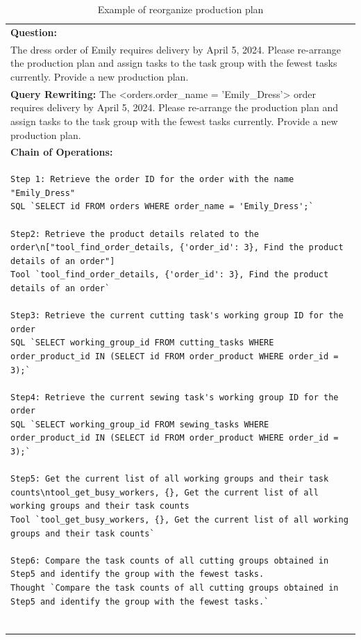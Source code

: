 \documentclass[preprint,12pt]{elsarticle}
\begin{document}
\begin{center}
\begin{longtable}{p{390pt}}
\caption{Example of reorganize production plan}
    \label{tab:case_reorganize_production_plan}\\
    \toprule
      \textbf{Question:} \\
       The dress order of Emily requires delivery by April 5, 2024. Please re-arrange the production plan and assign tasks to the task group with the fewest tasks currently. Provide a new production plan.\\
          \hline
          \textbf{Query Rewriting: }
          The <orders.order\_name = 'Emily\_Dress'> order requires delivery by April 5, 2024. Please re-arrange the production plan and assign tasks to the task group with the fewest tasks currently. Provide a new production plan.\\
 \hline
\textbf{Chain of Operations:}\\

\begin{lstlisting}[style=my_operation, label={lst:chain_of_operation}]
Step 1: Retrieve the order ID for the order with the name "Emily_Dress"
SQL `SELECT id FROM orders WHERE order_name = 'Emily_Dress';`

Step2: Retrieve the product details related to the order\n["tool_find_order_details, {'order_id': 3}, Find the product details of an order"]
Tool `tool_find_order_details, {'order_id': 3}, Find the product details of an order`

Step3: Retrieve the current cutting task's working group ID for the order
SQL `SELECT working_group_id FROM cutting_tasks WHERE order_product_id IN (SELECT id FROM order_product WHERE order_id = 3);`

Step4: Retrieve the current sewing task's working group ID for the order
SQL `SELECT working_group_id FROM sewing_tasks WHERE order_product_id IN (SELECT id FROM order_product WHERE order_id = 3);`

Step5: Get the current list of all working groups and their task counts\ntool_get_busy_workers, {}, Get the current list of all working groups and their task counts
Tool `tool_get_busy_workers, {}, Get the current list of all working groups and their task counts`

Step6: Compare the task counts of all cutting groups obtained in Step5 and identify the group with the fewest tasks.
Thought `Compare the task counts of all cutting groups obtained in Step5 and identify the group with the fewest tasks.`


\end{lstlisting}
\end{longtable}
\end{center}
\end{document}
